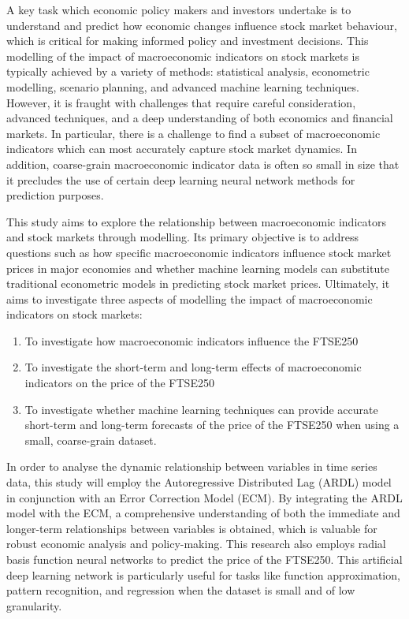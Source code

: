 \documentclass[11pt,a4paper]{article}
\begin{document}
A key task which economic policy makers and investors undertake is to 
understand and predict how economic changes influence stock market behaviour, 
which is critical for making informed policy and investment decisions. 
This modelling of the impact of macroeconomic indicators on stock markets is typically achieved by a variety of methods: statistical analysis, econometric modelling, scenario planning, and advanced machine learning techniques. However, it is fraught with challenges that require careful consideration, advanced techniques, and a deep understanding of both economics and financial markets. In particular, there is a challenge to find a subset of macroeconomic indicators which can most accurately capture stock market dynamics. 
In addition, coarse-grain macroeconomic indicator data is often so small in size that it precludes the use of certain deep learning neural network methods for prediction purposes.


This study aims to explore the relationship between macroeconomic indicators and stock markets 
through modelling. Its primary objective is to address questions such as how specific 
macroeconomic indicators influence stock market prices in major economies and whether machine 
learning models can substitute traditional econometric models in predicting stock market prices. 
Ultimately, it aims to investigate three aspects of modelling the impact of macroeconomic 
indicators on stock markets: 
\begin{enumerate}
    \item To investigate how macroeconomic indicators influence the FTSE250
    \item To investigate the short-term and long-term effects of macroeconomic indicators on the price of the FTSE250 
    \item To investigate whether machine learning techniques can provide accurate short-term and long-term forecasts of the price of the FTSE250 when using a small, coarse-grain dataset.
   
\end{enumerate}

In order to analyse the dynamic relationship between variables in time series data, this study will employ the Autoregressive Distributed Lag (ARDL) model in conjunction with an Error Correction Model (ECM). By integrating the ARDL model with the ECM, a comprehensive understanding of both the immediate and longer-term relationships between variables is obtained, which is valuable for robust economic analysis and policy-making.
This research also employs radial basis function neural networks to predict the price of the FTSE250. This artificial deep learning network is particularly useful for tasks like function approximation, pattern recognition, and regression when the dataset is small and of low granularity.
\end{document}
